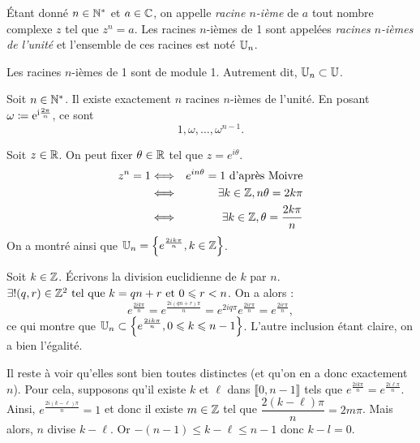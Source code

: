 \documentclass{magnolia}
\begin{document}
\begin{definition}[utile=-3]
Étant donné $n\in{\mathbb{N}^*}$ et $a\in\mathbb{C}$, on appelle \emph{racine $n$-ième} de $a$ tout
nombre complexe $z$ tel que $z^n=a$. Les racines $n$-ièmes de 1 sont appelées
\emph{racines $n$-ièmes de l'unité} et l'ensemble de ces racines est noté $\U[n]$.
\end{definition}

\begin{remarqueUnique}
\remarque Les racines $n$-ièmes de 1 sont de module 1. Autrement dit, $\U[n]\subset\U$.
\end{remarqueUnique}



\begin{proposition}[utile=-3]
Soit $n\in{\mathbb{N}^*}$. Il existe exactement $n$ racines $n$-ièmes de l'unité. En posant $\omega\coloneqq{\rm e}^{{\rm i}\frac{2\pi}{n}}$, ce sont
\[1,\omega,\ldots,\omega^{n-1}.\]
\end{proposition}

\begin{preuve}
Soit $z\in\mathbb{R}$. On peut fixer $\theta\in\mathbb{R}$ tel que $z=e^{i\theta}$.
\begin{eqnarray*}
z^n=1 &\Longleftrightarrow& e^{in\theta}=1 \text{ d'après Moivre}\\
&\Longleftrightarrow& \exists k\in \mathbb{Z}, n\theta=2k\pi \\
&\Longleftrightarrow& \exists k\in \mathbb{Z}, \theta=\dfrac{2k\pi}{n}
\end{eqnarray*}
On a montré ainsi que $\U[n]=\ens{e^{\frac{2ik\pi}{n}}, k\in \Z}$.

Soit $k\in \mathbb{Z}$. \'Ecrivons la division euclidienne de $k$ par $n$. $\exists ! (q,r) \in \mathbb{Z}^2 \text{ tel que } k=qn+r \text{ et } 0\leqslant r<n$. On a alors :
\[e^{\frac{2ik\pi}{n}}=e^{\frac{2i(qn+r)\pi}{n}}=e^{2iq\pi}e^{\frac{2ir\pi}{n}}=e^{\frac{2ir\pi}{n}},\]
ce qui montre que $\U[n]\subset\ens{e^{\frac{2ik\pi}{n}}, 0\leq k\leq n-1}$. L'autre inclusion étant claire, on a bien l'égalité.

Il reste à voir qu'elles sont bien toutes distinctes (et qu'on en a donc exactement $n$). Pour cela, supposons qu'il existe $k$ et $\ell$ dans $\llbracket0,n-1\rrbracket$ tels que $e^{\frac{2ik\pi}{n}} =e^{\frac{2i\ell\pi}{n}}$. Ainsi, $e^{\frac{2i(k-\ell)\pi}{n}}=1$ et donc il existe $m\in\mathbb{Z}$ tel que $\dfrac{2(k-\ell)\pi}{n}=2m\pi$. Mais alors, $n$ divise $k-\ell$. Or $-(n-1)\leq k-\ell \leq n-1$ donc $k-l=0$.
\end{preuve}
\end{document}

